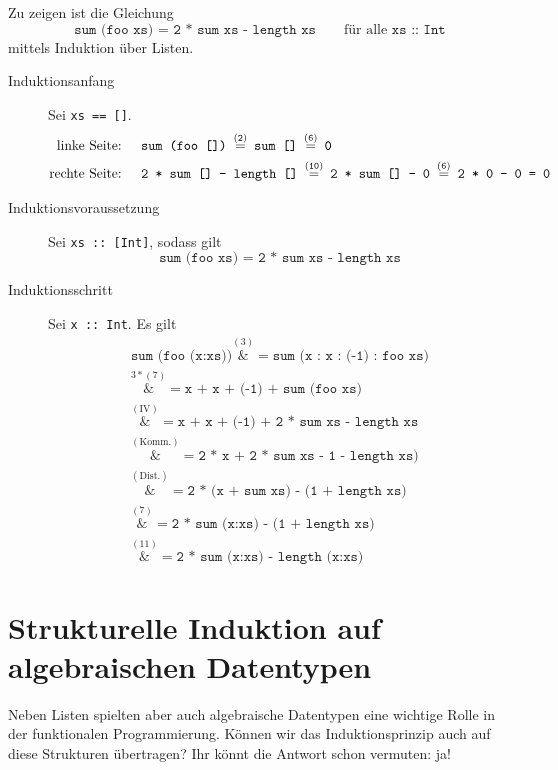 \documentclass[ngerman, a4paper, 11pt]{article}
\theoremstyle{nonumberplain}
\newcommand{\step}[2][]{\ensuremath{\overset{{#1} (\text{#2})}{=}}}
\newcommand*{\astep}[2][]{\ensuremath{\overset{{#1} (\text{#2})}&{=}}}
\begin{document}
Zu zeigen ist die Gleichung
\begin{equation*}
	\texttt{sum (foo xs) = 2 * sum xs - length xs} \qquad \text{für alle } \texttt{xs :: Int}
\end{equation*}
mittels Induktion über Listen.
\begin{description}	
	\item[Induktionsanfang] Sei \texttt{xs == []}. 
	\begin{align*}
		\text{linke Seite: } \quad &\texttt{sum (foo []) \step{2} sum [] \step{6} 0} \\
		\text{rechte Seite: } \quad &\texttt{2 * sum [] - length [] \step{10} 2 * sum [] - 0 \step{6} 2 * 0 - 0 = 0}
	\end{align*}
	
	\item[Induktionsvoraussetzung] Sei \texttt{xs :: [Int]}, sodass gilt
	\begin{equation*}
		\texttt{sum (foo xs) = 2 * sum xs - length xs}
	\end{equation*}

	\item[Induktionsschritt] Sei \texttt{x :: Int}. Es gilt
	\begin{align*}
		\texttt{sum (foo (x:xs))} \astep{3} \texttt{sum (x : x : (-1) : foo xs)} \\
		\astep[3*]{7} \texttt{x + x + (-1) + sum (foo xs)} \\
		\astep{IV} \texttt{x + x + (-1) + 2 * sum xs - length xs} \\
		\astep{Komm.} \texttt{2 * x + 2 * sum xs - 1 - length xs)} \\
		\astep{Dist.} \texttt{2 * (x + sum xs) - (1 + length xs)} \\
		\astep{7} \texttt{2 * sum (x:xs) - (1 + length xs)} \\
		\astep{11} \texttt{2 * sum (x:xs) - length (x:xs)} 
	\end{align*}
\end{description}


\section*{Strukturelle Induktion auf algebraischen Datentypen}

Neben Listen spielten aber auch algebraische Datentypen eine wichtige Rolle in der funktionalen Programmierung. Können wir das Induktionsprinzip auch auf diese Strukturen übertragen? Ihr könnt die Antwort schon vermuten: ja!
\end{document}
